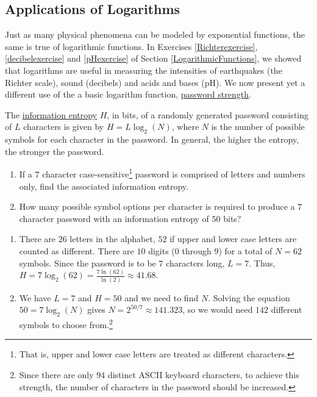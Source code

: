 \documentclass{ximera}
\begin{document}
\subsection{Applications of Logarithms}

Just as many physical phenomena can be modeled by exponential functions, the same is true of logarithmic functions.   In Exercises \ref{Richterexercise},  \ref{decibelexercise} and \ref{pHexercise} of Section \ref{LogarithmicFunctions}, we showed that logarithms are useful in measuring the intensities of earthquakes (the Richter scale), sound (decibels) and acids and bases (pH).  We now present yet a different use of the a basic logarithm function, \href{http://en.wikipedia.org/wiki/Password_strength}{\underline{password strength}}.

 

\begin{example}  The \href{http://en.wikipedia.org/wiki/Information_entropy}{\underline{information entropy}} $H$, in bits, of a randomly generated password consisting of $L$ characters is given by $H = L \log_{2}(N)$, where $N$ is the number of possible symbols for each character in the password.  In general, the higher the entropy, the stronger the password.  

\begin{enumerate}

\item  If a $7$ character case-sensitive\footnote{That is, upper and lower case letters are treated as different characters.} password is comprised of  letters and numbers only, find the associated information entropy.

\item  How many possible symbol options per character is required to produce a $7$ character password with an information entropy of $50$ bits?

\end{enumerate}


\begin{explanation}

\begin{enumerate}

\item  There are $26$ letters in the alphabet, $52$ if upper and lower case letters are counted as different.  There are $10$ digits ($0$ through $9$) for a total of $N=62$ symbols.  Since the password is to be $7$ characters long, $L = 7$.  Thus, $H = 7 \log_{2}(62) = \frac{7 \ln(62)}{\ln(2)} \approx 41.68$.

\item  We have $L = 7$ and $H=50$ and we need to find $N$.  Solving the equation $50 = 7 \log_{2}(N)$ gives $N = 2^{50/7} \approx 141.323$, so we would need $142$ different symbols to choose from.\footnote{Since there are only $94$ distinct ASCII keyboard characters, to achieve this strength, the number of characters in the password should be increased.} 

\end{enumerate}
\end{explanation}
\end{example}
\end{document}
